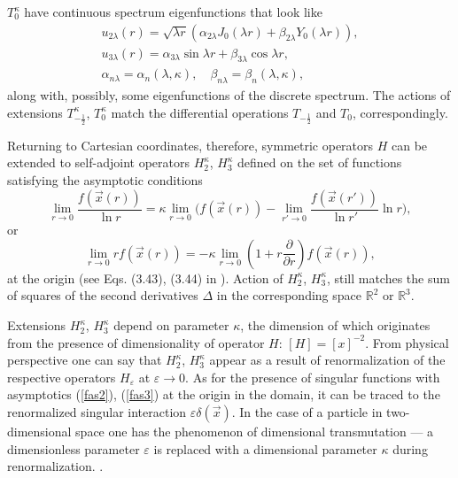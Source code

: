 \documentclass[12pt]{article}
\newcommand{\RR}{\mathbb{R}}
\newcommand{\ve}{\varepsilon}
\begin{document}
$ T_{0}^{\kappa} $
	have continuous spectrum eigenfunctions that look like
\begin{gather*}
    u_{2\lambda}(r) = \sqrt{\lambda r} (\alpha_{2\lambda} J_{0}(\lambda r)
	+ \beta_{2\lambda} Y_{0}(\lambda r)) , \\
    u_{3\lambda}(r) = \alpha_{3\lambda} \sin \lambda r
	+ \beta_{3\lambda} \cos\lambda r , \\
    \alpha_{n\lambda} = \alpha_{n}(\lambda,\kappa), \quad
    \beta_{n\lambda} = \beta_{n}(\lambda,\kappa),
\end{gather*}
	along with, possibly, some eigenfunctions of the discrete spectrum.
	The actions of extensions
$ T_{-\frac{1}{2}}^{\kappa} $,
$ T_{0}^{\kappa} $
	match the differential operations
$ T_{-\frac{1}{2}} $ and
$ T_{0} $, correspondingly.

	Returning to Cartesian coordinates, therefore, symmetric operators
$ H $
	can be extended to self-adjoint operators
$ H_{2}^{\kappa} $, 
$ H_{3}^{\kappa} $
	defined on the set of functions satisfying the asymptotic conditions
\begin{equation}
\label{fas2}
    \lim_{r\to 0} \frac{f(\vec{x}(r))}{\ln r} = \kappa \lim_{r\to 0}\bigl(
	f(\vec{x}(r)) -\lim_{r'\to 0} \frac{f(\vec{x}(r'))}{\ln r'} \ln r
    \bigr) ,
\end{equation}
	or
\begin{equation}
\label{fas3}
    \lim_{r\to 0} rf(\vec{x}(r)) = -\kappa \lim_{r\to 0}(
	1 + r \frac{\partial}{\partial r} ) f(\vec{x}(r)) ,
\end{equation}
	at the origin
    (see Eqs. (3.43), (3.44) in
\cite{Jackiw}).
	Action of 
$ H_{2}^{\kappa} $,
$ H_{3}^{\kappa} $,
	still matches the sum of squares of the second derivatives
$ \Delta $ in the corresponding space
$ \RR^{2} $ or
$ \RR^{3} $.

	Extensions
$ H_{2}^{\kappa} $,
$ H_{3}^{\kappa} $
	depend on parameter
$ \kappa $,
	the dimension of which originates from the presence of dimensionality of operator
$ H $:
$ [H] = [x]^{-2} $.
	From physical perspective one can say that
$ H_{2}^{\kappa} $,
$ H_{3}^{\kappa} $
	appear as a result of renormalization of the respective operators
$ H_{\ve} $
	at
$ \ve \to 0 $.
	As for the presence of singular functions with asymptotics
(\ref{fas2}),
(\ref{fas3})
	at the origin in the domain, it can be traced to the
	renormalized singular interaction
$ \ve \delta(\vec{x}) $.
	In the case of a particle in two-dimensional space one
	has the phenomenon of dimensional transmutation ---
	a dimensionless parameter
$ \ve $
	is replaced with a dimensional parameter
$ \kappa $
	during renormalization.
\cite{LFres}.
\end{document}
